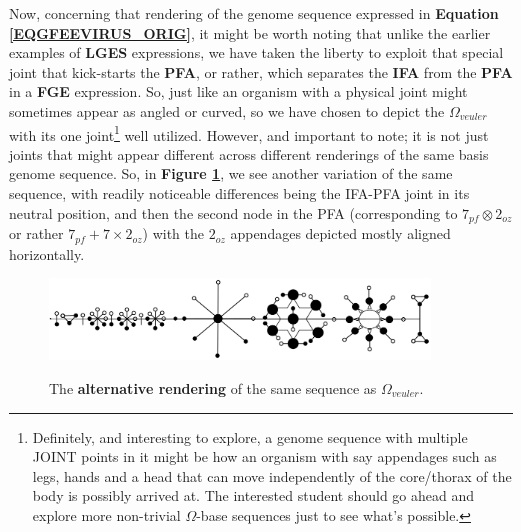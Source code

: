\documentclass[a4paper, 18pt]{book} %
\begin{document}
\begin{appendices}
Now, concerning that rendering of the genome sequence expressed in \textbf{Equation \ref{EQGFEEVIRUS_ORIG}}, it might be worth noting that unlike the earlier examples of \textbf{LGES} expressions, we have taken the liberty to exploit that special joint that kick-starts the \textbf{PFA}, or rather, which separates the \textbf{IFA} from the \textbf{PFA} in a \textbf{FGE} expression. So, just like an organism with a physical joint might sometimes appear as angled or curved, so we have chosen to depict the $\Omega_{veuler}$ with its one joint\footnote{Definitely, and interesting to explore, a genome sequence with multiple JOINT points in it might be how an organism with say appendages such as legs, hands and a head that can move independently of the core/thorax of the body is possibly arrived at. The interested student should go ahead and explore more non-trivial $\Omega$-base sequences just to see what's possible.} well utilized. However, and important to note; it is not just joints that might appear different across different renderings of the same basis genome sequence. So, in \textbf{Figure \ref{FIGLGESEULERVIRUSv2_ORIG}}, we see another variation of the same sequence, with readily noticeable differences being the IFA-PFA joint in its neutral position, and then the second node in the PFA (corresponding to \textbf{$7_{pf} \otimes 2_{oz}$} or rather \textbf{$7_{pf} + 7 \times 2_{oz}$}) with the $2_{oz}$ appendages depicted mostly aligned horizontally.


\begin{figure}[H]
  \begin{center}
   \includegraphics[trim=0cm 0cm 0cm 0cm, clip, width=0.9\textwidth,]{resources/pdfs/v2-PLATONIC-EULERVIRUS-landscape_ORIG.pdf}\\
   \caption{The \textbf{alternative rendering}  of the same sequence as $\Omega_{veuler}$.}
  \label{FIGLGESEULERVIRUSv2_ORIG}
  \end{center}
\end{figure}


\end{appendices}
\end{document}
